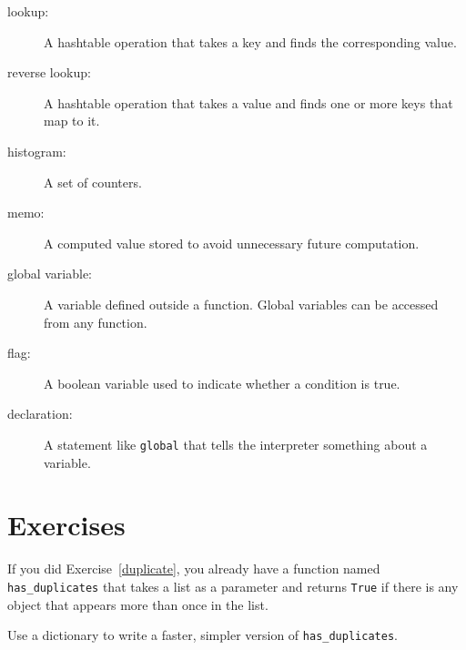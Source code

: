 \documentclass[10pt]{book}
\begin{document}
{\begin{description}
\item[lookup:] A hashtable operation that takes a key and finds
the corresponding value.

\item[reverse lookup:] A hashtable operation that takes a value and finds
one or more keys that map to it.
% 
% 

\item[histogram:] A set of counters.

\item[memo:] A computed value stored to avoid unnecessary future 
computation.

\item[global variable:]  A variable defined outside a function.  Global
variables can be accessed from any function.

\item[flag:] A boolean variable used to indicate whether a condition
is true.

\item[declaration:] A statement like {\tt global} that tells the
interpreter something about a variable.

\end{description}

\section{Exercises}

\begin{ex}

If you did Exercise~\ref{duplicate}, you already have
a function named \verb"has_duplicates" that takes a list
as a parameter and returns {\tt True} if there is any object
that appears more than once in the list.

Use a dictionary to write a faster, simpler version of
\verb"has_duplicates".
\end{ex}


\begin{ex}
\label{exrotatepairs}


\end{ex}}
\end{document}
